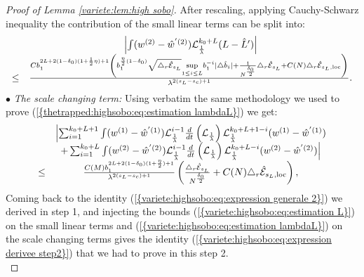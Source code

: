 \documentclass[11pt,a4paper,reqno]{amsart}
\theoremstyle{remark}
\numberwithin{equation}{section}
\begin{document}
\begin{proof}[Proof of Lemma \ref{variete:lem:high sobo}]
After rescaling, applying Cauchy-Schwarz inequality the contribution of the small linear terms can be split into:
\begin{equation} \label{variete:highsobo:eq:estimation L}
\begin{array}{r c l}
&\left| \int (w^{(2)}-\hat{w}^{'(2)})\mathcal{L}_{\frac{1}{\lambda}}^{k_0+L} (L-\hat{L}')\right|\\
\leq& \frac{Cb_1^{2L+2(1-\delta_0)(1+\frac{1}{2}\eta)+1}\left(b_1^{\frac{\eta}{2}(1-\delta_0)}\sqrt{\triangle_r \hat{\mathcal{E}}_{s_L}} \underset{1\leq i \leq L}{\text{sup}}b_1^{-i}|\triangle \hat{b}_i|+\frac{1}{N^{\frac{\delta_0}{2}}}\triangle_r \hat{\mathcal{E}}_{s_L}+C(N)\triangle_r \hat{\mathcal{E}}_{s_L,\text{loc}}\right)}{\lambda^{2(s_L-s_c)+1}}.
\end{array}
\end{equation}
$\bullet$ \emph{The scale changing term:} Using verbatim the same methodology we used to prove {{\rm (\ref{{thetrapped:highsobo:eq:estimation lambdaL}})}} we get:
\begin{equation} \label{variete:highsobo:eq:estimation lambdaL}
\begin{array}{r c l}
&\Bigl{|} \sum_{i=1}^{k_0+L+1} \int (w^{(1)}-\hat{w}^{'(1)}) \mathcal{L}_{\frac{1}{\lambda}}^{i-1}\frac{d}{dt}\left( \mathcal{L}_{\frac{1}{\lambda}}\right)\mathcal{L}_{\frac{1}{\lambda}}^{k_0+L+1-i} (w^{(1)}-\hat{w}^{'(1)}) \\
&+\sum_{i=1}^{k_0+L} \int (w^{(2)}-\hat{w}^{'(2)}) \mathcal{L}_{\frac{1}{\lambda}}^{i-1}\frac{d}{dt}\left( \mathcal{L}_{\frac{1}{\lambda}}\right) \mathcal{L}_{\frac{1}{\lambda}}^{k_0+L-i} (w^{(2)}-\hat{w}^{'(2)}) \Bigr{|} \\
\leq &\frac{C(M)b_1^{2L+2(1-\delta_0)(1+\frac{\eta}{2})+1}}{\lambda^{2(s_L-s_c)+1}} \left(\frac{\triangle_r \hat{\mathcal{E}}_{s_L}}{N^{\frac{\delta_0}{2}}} +C(N) \triangle_r \hat{\mathcal{E}}_{s_L,\text{loc}} \right) ,
\end{array}
\end{equation}
Coming back to the identity {{\rm (\ref{{variete:highsobo:eq:expression generale 2}})}} we derived in step 1, and injecting the bounds {{\rm (\ref{{variete:highsobo:eq:estimation L}})}}  on the small linear terms and {{\rm (\ref{{variete:highsobo:eq:estimation lambdaL}})}} on the scale changing terms gives the identity {{\rm (\ref{{variete:highsobo:eq:expression derivee step2}})}} that we had to prove in this step 2.\\


\end{proof}
\end{document}
